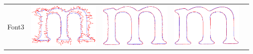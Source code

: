 \documentclass[12pt]{article}
\begin{document}
\begin{center}
\begin{tabular}{|c|c|c|c|c|}
Font3 & 
\includegraphics[scale = 0.2]{images/f3var10} &
\includegraphics[scale = 0.2]{images/f3var1} &
\includegraphics[scale = 0.2]{images/f3var0_1} &

\end{tabular}
\end{center}
\end{document}

